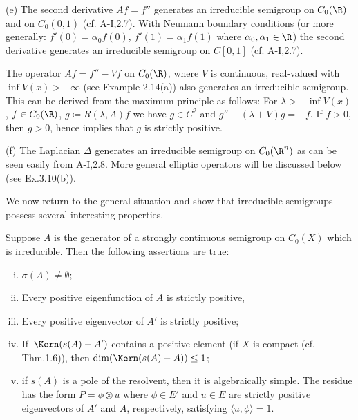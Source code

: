 \begin{examples}
	(e) The second derivative $Af = f''$ generates an irreducible semigroup on $C_{0}(\R)$ and on $C_{0}(0,1)$ (cf. A-I,2.7).
	With Neumann boundary conditions (or more generally: $f'(0) = \alpha_{0}f(0)$, $f'(1) = \alpha_{1}f(1)$ where $\alpha_{0}, \alpha_{1} \in \R$) the second derivative generates an irreducible semigroup on $C[0,1]$ (cf. A-I,2.7).
	
	The operator $Af = f'' - Vf$ on $C_{0}(\R)$, where $V$ is continuous, real-valued with $\inf V(x) > -\infty$ (see Example 2.14(a)) also generates an irreducible semigroup.
	This can be derived from the maximum principle as follows: For $\lambda > -\inf V(x)$, $f \in C_{0}(\R)$, $g \coloneq R(\lambda,A)f$ we have $g \in C^2$ and $g'' - (\lambda + V)g = -f$.
	If $f > 0$, then $g > 0$, hence \citet[Chap.I, Thm.3]{protterweinberger:1967} implies that $g$ is strictly positive.
	
	(f) The Laplacian $\Delta$ generates an irreducible semigroup on $C_{0}(\R^n)$ as can be seen easily from A-I,2.8.
	More general elliptic operators will be discussed below (see Ex.3.10(b)).
\end{examples}
We now return to the general situation and show that irreducible semigroups possess several interesting properties.
\begin{proposition}\label{prop:b3-3.5}
	Suppose $A$ is the generator of a strongly continuous semigroup on $C_{0}(X)$ which is irreducible.
	Then the following assertions are true:
	\begin{enumerate}[(i)]
		\item 
		$\sigma(A) \neq \emptyset$;
		
		\item 
		Every positive eigenfunction of $A$ is strictly positive,
		
		\item 
		Every positive eigenvector of $A'$ is strictly positive;
		
		\item 
		If\ $\Kern(s(A) - A')$ contains a positive element (\eg if $X$ is compact (cf. Thm.1.6)), then $\dim(\Kern(s(A) - A)) \leq 1$;
		
		\item 
		if $s(A)$ is a pole of the resolvent, then it is algebraically simple.
		The residue has the form $P = \phi \otimes u$ where $\phi \in E'$ and $u \in E$ are strictly positive eigenvectors of $A'$ and $A$, respectively, satisfying $\langle u,\phi\rangle = 1$.
	\end{enumerate}
\end{proposition}

